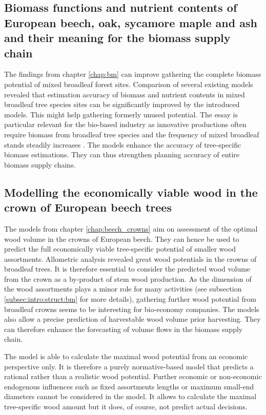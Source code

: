 \subsection{Biomass functions and nutrient contents of European beech, oak, sycamore maple and ash and their meaning for the biomass supply chain}
\label{subsec:discussion:struct:bm}
The findings from chapter \ref{chap:bm} can improve gathering the complete biomass potential of mixed broadleaf forest sites. Comparison of several existing models revealed that estimation accuracy of biomass and nutrient contents in mixed broadleaf tree species sites can be significantly improved by the introduced models. This might help gathering formerly unused potential. The essay is particular relevant for the bio-based industry as innovative productions often require biomass from broadleaf tree species \citep[p. 1]{auer_2016} and the frequency of mixed broadleaf stands steadily increases \citep{ti_2014}. The models enhance the accuracy of tree-specific biomass estimations. They can thus strengthen planning accuracy of entire biomass supply chains.

\subsection{Modelling the economically viable wood in the crown of European beech trees}
\label{subsec:discussion:struct:beech_crowns}
The models from chapter \ref{chap:beech_crowns} aim on assessment of the optimal wood volume in the crowns of European beech. They can hence be used to predict the full economically viable tree-specific potential of smaller wood assortments. Allometric analysis revealed great wood potentials in the crowns of broadleaf trees. It is therefore essential to consider the predicted wood volume from the crown as a by-product of stem wood production. As the dimension of the wood assortments plays a minor role for many activities (see subsection \ref{subsec:intro:struct:bm} for more details), gathering further wood potential from broadleaf crowns seems to be interesting for bio-economy companies. The models also allow a precise prediction of harvestable wood volume prior harvesting. They can therefore enhance the forecasting of volume flows in the biomass supply chain.

The model is able to calculate the maximal wood potential from an economic perspective only. It is therefore a purely normative-based model that predicts a rational rather than a realistic wood potential. Further economic or non-economic endogenous influences such as fixed assortments lengths or maximum small-end diameters cannot be considered in the model. It allows to calculate the maximal tree-specific wood amount but it does, of course, not predict actual decisions.

